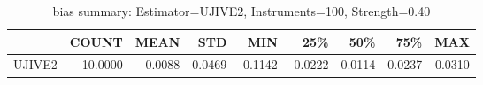\begin{table}[ht]
\centering
\caption{bias summary: Estimator=UJIVE2, Instruments=100, Strength=0.40}
\begin{tabular}{lrrrrrrrr}
\toprule
 & COUNT & MEAN & STD & MIN & 25\% & 50\% & 75\% & MAX \\
\midrule
UJIVE2 & 10.0000 & -0.0088 & 0.0469 & -0.1142 & -0.0222 & 0.0114 & 0.0237 & 0.0310 \\
\bottomrule
\end{tabular}
\end{table}
